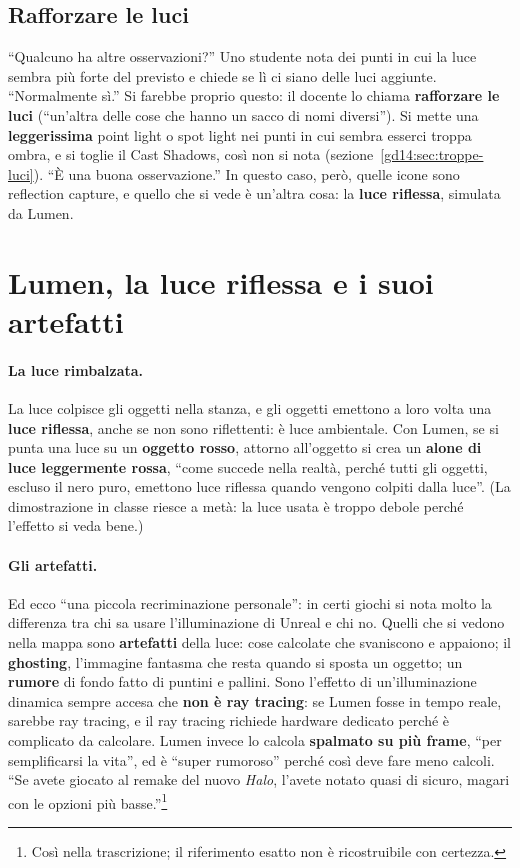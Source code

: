 \subsection{Rafforzare le luci}

``Qualcuno ha altre osservazioni?'' Uno studente nota dei punti in cui la luce sembra
più forte del previsto e chiede se lì ci siano delle luci aggiunte. ``Normalmente
sì.'' Si farebbe proprio questo: il docente lo chiama \textbf{rafforzare le luci}
(``un'altra delle cose che hanno un sacco di nomi diversi''). Si mette una
\textbf{leggerissima} point light o spot light nei punti in cui sembra esserci troppa
ombra, e si toglie il Cast Shadows, così non si nota
(sezione~\ref{gd14:sec:troppe-luci}). ``È una buona osservazione.'' In questo caso,
però, quelle icone sono reflection capture, e quello che si vede è un'altra cosa: la
\textbf{luce riflessa}, simulata da Lumen.

\section{Lumen, la luce riflessa e i suoi artefatti}
\label{gd14:sec:lumen}

\paragraph{La luce rimbalzata.} La luce colpisce gli oggetti nella stanza, e gli
oggetti emettono a loro volta una \textbf{luce riflessa}, anche se non sono
riflettenti: è luce ambientale. Con Lumen, se si punta una luce su un \textbf{oggetto
rosso}, attorno all'oggetto si crea un \textbf{alone di luce leggermente rossa},
``come succede nella realtà, perché tutti gli oggetti, escluso il nero puro,
emettono luce riflessa quando vengono colpiti dalla luce''. (La dimostrazione in
classe riesce a metà: la luce usata è troppo debole perché l'effetto si veda bene.)

\paragraph{Gli artefatti.} Ed ecco ``una piccola recriminazione personale'': in
certi giochi si nota molto la differenza tra chi sa usare l'illuminazione di Unreal
e chi no. Quelli che si vedono nella mappa sono \textbf{artefatti} della luce: cose
calcolate che svaniscono e appaiono; il \textbf{ghosting}, l'immagine fantasma che
resta quando si sposta un oggetto; un \textbf{rumore} di fondo fatto di puntini e
pallini. Sono l'effetto di un'illuminazione dinamica sempre accesa che \textbf{non è
ray tracing}: se Lumen fosse in tempo reale, sarebbe ray tracing, e il ray tracing
richiede hardware dedicato perché è complicato da calcolare. Lumen invece lo
calcola \textbf{spalmato su più frame}, ``per semplificarsi la vita'', ed è ``super
rumoroso'' perché così deve fare meno calcoli. ``Se avete giocato al remake del
nuovo \emph{Halo}, l'avete notato quasi di sicuro, magari con le opzioni più
basse.''\footnote{Così nella trascrizione; il riferimento esatto non è
ricostruibile con certezza.}

